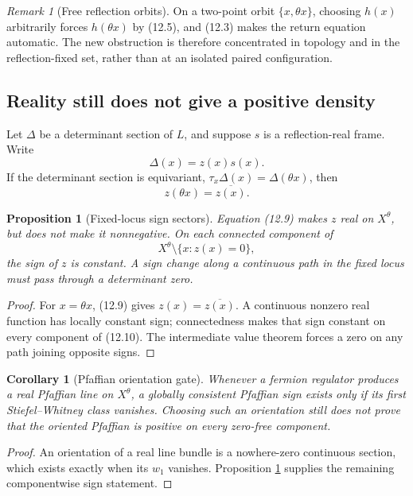 \documentclass[11pt]{article}
\newtheorem{proposition}[theorem]{Proposition}
\newtheorem{corollary}[theorem]{Corollary}
\theoremstyle{remark}
\newtheorem{remark}[theorem]{Remark}
\begin{document}
\begin{remark}[Free reflection orbits]
\label{rem:v19v9-free}
On a two-point orbit \(\{x,\theta x\}\), choosing \(h(x)\) arbitrarily
forces \(h(\theta x)\) by (12.5), and (12.3) makes the return equation
automatic.  The new obstruction is therefore concentrated in topology and
in the reflection-fixed set, rather than at an isolated paired
configuration.
\end{remark}

\subsection{Reality still does not give a positive density}

Let \(\Delta\) be a determinant section of \(L\), and suppose \(s\) is a
reflection-real frame.  Write
\[
 \Delta(x)=z(x)s(x).                                           \tag{12.8}
\]
If the determinant section is equivariant,
\(\tau_x\Delta(x)=\Delta(\theta x)\), then
\[
 z(\theta x)=\overline{z(x)}.                                  \tag{12.9}
\]

\begin{proposition}[Fixed-locus sign sectors]
\label{prop:v19v9-sign}
Equation (12.9) makes \(z\) real on \(X^\theta\), but does not make it
nonnegative.  On each connected component of
\[
 X^\theta\setminus\{x:z(x)=0\},                                \tag{12.10}
\]
the sign of \(z\) is constant.  A sign change along a continuous path in
the fixed locus must pass through a determinant zero.
\end{proposition}

\begin{proof}
For \(x=\theta x\), (12.9) gives \(z(x)=\overline{z(x)}\).
A continuous nonzero real function has locally constant sign; connectedness
makes that sign constant on every component of (12.10).  The intermediate
value theorem forces a zero on any path joining opposite signs.
\end{proof}

\begin{corollary}[Pfaffian orientation gate]
\label{cor:v19v9-pfaffian}
Whenever a fermion regulator produces a real Pfaffian line on
\(X^\theta\), a globally consistent Pfaffian sign exists only if its first
Stiefel--Whitney class vanishes.  Choosing such an orientation still does
not prove that the oriented Pfaffian is positive on every zero-free
component.
\end{corollary}

\begin{proof}
An orientation of a real line bundle is a nowhere-zero continuous section,
which exists exactly when its \(w_1\) vanishes.  Proposition
\ref{prop:v19v9-sign} supplies the remaining componentwise sign statement.
\end{proof}
\end{document}
